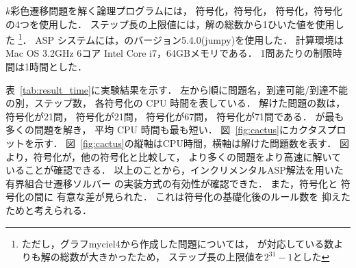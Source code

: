 $k$彩色遷移問題を解く論理プログラムには，
符号化，符号化，
符号化，符号化
の4つを使用した．
ステップ長の上限値には，解の総数から1ひいた値を使用した
\footnote{ただし，グラフmyciel4から作成した問題については，
{\clingo}が対応している数よりも解の総数が大きかったため，
ステップ長の上限値を$2^{31}-1$とした}．
ASP システムには，{\clingo}のバージョン5.4.0(jumpy)を使用した．
計算環境は Mac OS 3.2GHz 6コア Intel Core i7，64GBメモリである．
1問あたりの制限時間は1時間とした．

表~\ref{tab:result_time}に実験結果を示す．
左から順に問題名，到達可能/到達不能の別，ステップ数，
各符号化の CPU 時間を表している．
解けた問題の数は，
符号化が21問，
符号化が21問，
符号化が67問，
符号化が71問である．
が最も多くの問題を解き，
平均 CPU 時間も最も短い．
%
図~\ref{fig:cactus}にカクタスプロットを示す．
図~\ref{fig:cactus}の縦軸はCPU時間，横軸は解けた問題数を表す．
図より，符号化が，他の符号化と比較して，
より多くの問題をより高速に解いていることが確認できる．
以上のことから，インクリメンタルASP解法を用いた有界組合せ遷移ソルバー
の実装方式の有効性が確認できた．
また，符号化と
符号化の間に
有意な差が見られた．
これは符号化の基礎化後のルール数を
抑えたためと考えられる．



